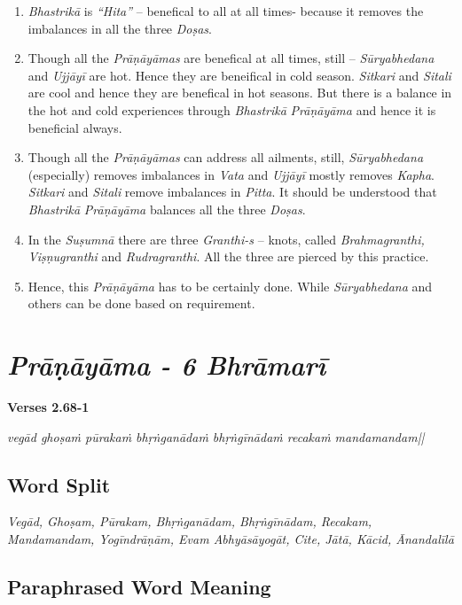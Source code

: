 \begin{enumerate}
\item  \textit{Bhastrikā} is \textit{“Hita”} – benefical to all at all times- because it removes the imbalances in all the three  \textit{Doṣas}. 
\item Though all the \textit{Prāṇāyāmas} are benefical at all times, still – \textit{Sūryabhedana} and \textit{Ujjāyī} are hot. Hence they are beneifical in cold season.  \textit{Sitkari} and  \textit{Sitali} are cool and hence they are benefical in hot seasons.  But there is a balance in the hot and cold experiences through  \textit{Bhastrikā} \textit{Prāṇāyāma} and hence it is beneficial always. 
\item Though all the \textit{Prāṇāyāmas} can address all ailments, still,  \textit{Sūryabhedana} (especially) removes imbalances in  \textit{Vata} and \textit{Ujjāyī} mostly removes \textit{Kapha}.  \textit{Sitkari} and  \textit{Sitali} remove imbalances in  \textit{Pitta}. It should be understood that \textit{Bhastrikā} \textit{Prāṇāyāma} balances all the three  \textit{Doṣas}.  
\item In the  \textit{Suṣumnā} there are three  \textit{Granthi-s} – knots, called  \textit{Brahmagranthi, Viṣṇugranthi} and  \textit{Rudragranthi}.  All the three are pierced by this practice. 
\item Hence, this \textit{Prāṇāyāma} has to be certainly done. While  \textit{Sūryabhedana} and others can be done based on requirement.
\end{enumerate}
    
\section*{\textit{Prāṇāyāma - 6 Bhrāmarī}}

\noindent \textbf{Verses 2.68-1}

\textit{vegād ghoṣaṁ pūrakaṁ bhṛṅganādaṁ  bhṛṅgīnādaṁ recakaṁ manda\-mandam||}

\subsection*{Word Split}


\textit{Vegād, Ghoṣam, Pūrakam, Bhṛṅganādam, Bhṛṅgīnādam, Recakam, Mandamandam, Yogīndrāṇām, Evam Abhyāsāyogāt, Cite, Jātā, Kācid, Ānandalīlā}

\subsection*{Paraphrased Word Meaning}


